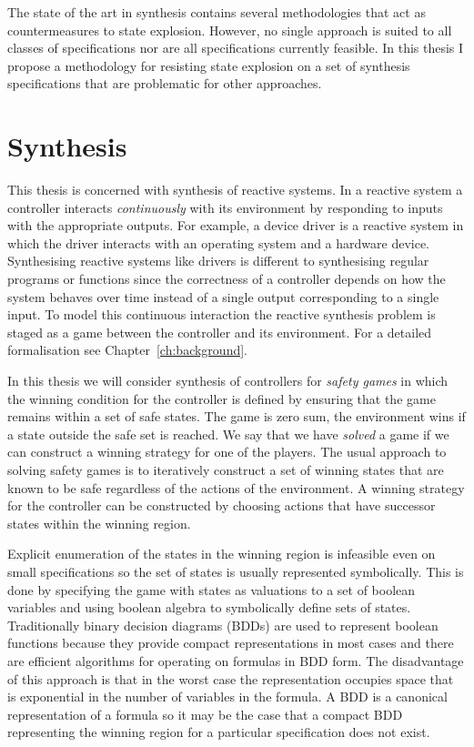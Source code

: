 The state of the art in synthesis contains several methodologies that act as countermeasures to state explosion. However, no single approach is suited to all classes of specifications nor are all specifications currently feasible. In this thesis I propose a methodology for resisting state explosion on a set of synthesis specifications that are problematic for other approaches.

\section{Synthesis}

This thesis is concerned with synthesis of reactive systems. In a reactive system a controller interacts \emph{continuously} with its environment by responding to inputs with the appropriate outputs. For example, a device driver is a reactive system in which the driver interacts with an operating system and a hardware device. Synthesising reactive systems like drivers is different to synthesising regular programs or functions since the correctness of a controller depends on how the system behaves over time instead of a single output corresponding to a single input. To model this continuous interaction the reactive synthesis problem is staged as a game between the controller and its environment. For a detailed formalisation see Chapter~\ref{ch:background}.

In this thesis we will consider synthesis of controllers for \emph{safety games} in which the winning condition for the controller is defined by ensuring that the game remains within a set of safe states. The game is zero sum, the environment wins if a state outside the safe set is reached. We say that we have \emph{solved} a game if we can construct a winning strategy for one of the players. The usual approach to solving safety games is to iteratively construct a set of winning states that are known to be safe regardless of the actions of the environment. A winning strategy for the controller can be constructed by choosing actions that have successor states within the winning region.

Explicit enumeration of the states in the winning region is infeasible even on small specifications so the set of states is usually represented symbolically. This is done by specifying the game with states as valuations to a set of boolean variables and using boolean algebra to symbolically define sets of states. Traditionally binary decision diagrams (BDDs) are used to represent boolean functions because they provide compact representations in most cases and there are efficient algorithms for operating on formulas in BDD form. The disadvantage of this approach is that in the worst case the representation occupies space that is exponential in the number of variables in the formula. A BDD is a canonical representation of a formula so it may be the case that a compact BDD representing the winning region for a particular specification does not exist.


